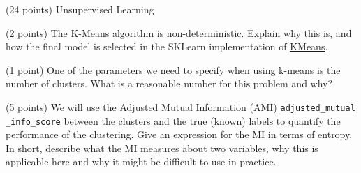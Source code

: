 \documentclass[12pt]{article}
\begin{document}
\begin{question}{\label{Q_UNSUP_LEARN}(24 points) Unsupervised Learning}




\begin{subquestion}{(2 points) The K-Means algorithm is non-deterministic. Explain why this is, and how the final model is selected in the SKLearn implementation of \href{https://scikit-learn.org/stable/modules/clustering.html}{KMeans}.}






\end{subquestion}


\begin{subquestion}{(1 point) One of the parameters we need to specify when using k-means is the number of clusters. What is a reasonable number for this problem and why?}






\end{subquestion}


\begin{subquestion}{(5 points) We will use the Adjusted Mutual Information (AMI) \ie \href{https://scikit-learn.org/stable/modules/clustering.html\#mutual-info-score}{\texttt{adjusted\_mutual\\\_info\_score}} between the clusters and the true (known) labels to quantify the performance of the clustering. Give an expression for the MI in terms of entropy. In short, describe what the MI measures about two variables, why this is applicable here and why it might be difficult to use in practice. }




\end{subquestion}
\end{question}
\end{document}
